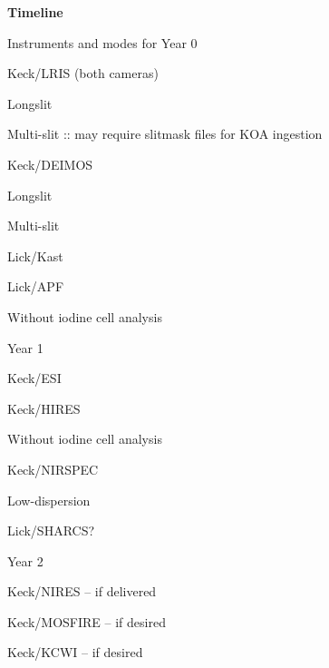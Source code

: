 \documentclass[11pt,preprint]{aastex}
\newenvironment{my_itemize}{
\begin{itemize}
  \setlength{\itemsep}{1pt}
  \setlength{\parskip}{0pt}
  \setlength{\parsep}{0pt}}{\end{itemize}
}
\newenvironment{my_enumerate}{
\begin{enumerate}
  \setlength{\itemsep}{1pt}
  \setlength{\parskip}{0pt}
  \setlength{\parsep}{0pt}}{\end{enumerate}
}
\begin{document}
\vskip 0.2in

\begin{center}
{\bf Timeline}
\end{center}

\begin{my_enumerate}
\item Instruments and modes for Year 0
  \begin{my_itemize}
  \item Keck/LRIS (both cameras)
    \begin{my_itemize}
    \item Longslit
    \item Multi-slit :: may require slitmask files for KOA ingestion
    \end{my_itemize}
  \item Keck/DEIMOS
    \begin{my_itemize}
    \item Longslit
    \item Multi-slit 
    \end{my_itemize}
  \item Lick/Kast
  \item Lick/APF
    \begin{my_itemize}
    \item Without iodine cell analysis
    \end{my_itemize}
  \end{my_itemize}
\item Year 1
  \begin{my_itemize}
  \item Keck/ESI
  \item Keck/HIRES
    \begin{my_itemize}
    \item Without iodine cell analysis
    \end{my_itemize}
  \item Keck/NIRSPEC
    \begin{my_itemize}
    \item Low-dispersion
    \end{my_itemize}
  \item Lick/SHARCS?
  \end{my_itemize}
\item Year 2
  \begin{my_itemize}
  \item Keck/NIRES -- if delivered
  \item Keck/MOSFIRE -- if desired
  \item Keck/KCWI -- if desired
  \end{my_itemize}
\end{my_enumerate}
\end{document}
